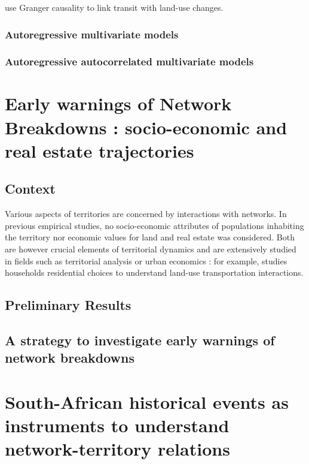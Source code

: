 \cite{xie2009streetcars} use Granger causality to link transit with land-use changes.


\subsubsection{Autoregressive multivariate models}



\subsubsection{Autoregressive autocorrelated multivariate models}












\newpage

\section{Early warnings of Network Breakdowns : socio-economic and real estate trajectories}


\subsection{Context}

Various aspects of territories are concerned by interactions with networks. In previous empirical studies, no socio-economic attributes of populations inhabiting the territory nor economic values for land and real estate was considered. Both are however crucial elements of territorial dynamics and are extensively studied in fields such as territorial analysis or urban economics : for example, \cite{homocianu:tel-00359302} studies households residential choices to understand land-use transportation interactions.



\subsection{Preliminary Results}




\subsection{A strategy to investigate early warnings of network breakdowns}









\section{South-African historical events as instruments to understand network-territory relations}








